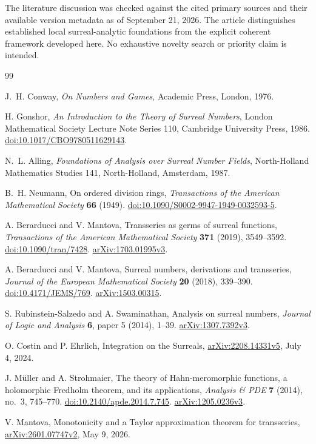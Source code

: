 \documentclass[11pt,a4paper]{article}
\theoremstyle{definition}\newtheorem{definition}[theorem]{Definition}
\theoremstyle{remark}\newtheorem{remark}[theorem]{Remark}
\numberwithin{equation}{section}
\begin{document}
The literature discussion was checked against the cited primary sources and their available version metadata as of September 21, 2026. The article distinguishes established local surreal-analytic foundations from the explicit coherent framework developed here. No exhaustive novelty search or priority claim is intended.

\begin{thebibliography}{99}

J.~H. Conway, \emph{On Numbers and Games}, Academic Press, London, 1976.

H. Gonshor, \emph{An Introduction to the Theory of Surreal Numbers}, London Mathematical Society Lecture Note Series 110, Cambridge University Press, 1986.
\href{https://doi.org/10.1017/CBO9780511629143}{doi:10.1017/CBO9780511629143}.

N.~L. Alling, \emph{Foundations of Analysis over Surreal Number Fields}, North-Holland Mathematics Studies 141, North-Holland, Amsterdam, 1987.

B.~H. Neumann, On ordered division rings, \emph{Transactions of the American Mathematical Society} \textbf{66} (1949).
\href{https://doi.org/10.1090/S0002-9947-1949-0032593-5}{doi:10.1090/S0002-9947-1949-0032593-5}.

A. Berarducci and V. Mantova, Transseries as germs of surreal functions, \emph{Transactions of the American Mathematical Society} \textbf{371} (2019), 3549--3592.
\href{https://doi.org/10.1090/tran/7428}{doi:10.1090/tran/7428}.
\href{https://arxiv.org/abs/1703.01995v3}{arXiv:1703.01995v3}.

A. Berarducci and V. Mantova, Surreal numbers, derivations and transseries, \emph{Journal of the European Mathematical Society} \textbf{20} (2018), 339--390.
\href{https://doi.org/10.4171/JEMS/769}{doi:10.4171/JEMS/769}.
\href{https://arxiv.org/abs/1503.00315}{arXiv:1503.00315}.

S. Rubinstein-Salzedo and A. Swaminathan, Analysis on surreal numbers, \emph{Journal of Logic and Analysis} \textbf{6}, paper 5 (2014), 1--39.
\href{https://arxiv.org/abs/1307.7392v3}{arXiv:1307.7392v3}.

O. Costin and P. Ehrlich, Integration on the Surreals,
\href{https://arxiv.org/abs/2208.14331v5}{arXiv:2208.14331v5}, July 4, 2024.

J. M\"uller and A. Strohmaier, The theory of Hahn-meromorphic functions, a holomorphic Fredholm theorem, and its applications, \emph{Analysis \& PDE} \textbf{7} (2014), no.~3, 745--770.
\href{https://doi.org/10.2140/apde.2014.7.745}{doi:10.2140/apde.2014.7.745}.
\href{https://arxiv.org/abs/1205.0236v3}{arXiv:1205.0236v3}.

V. Mantova, Monotonicity and a Taylor approximation theorem for transseries,
\href{https://arxiv.org/abs/2601.07747v2}{arXiv:2601.07747v2}, May 9, 2026.

\end{thebibliography}
\end{document}
